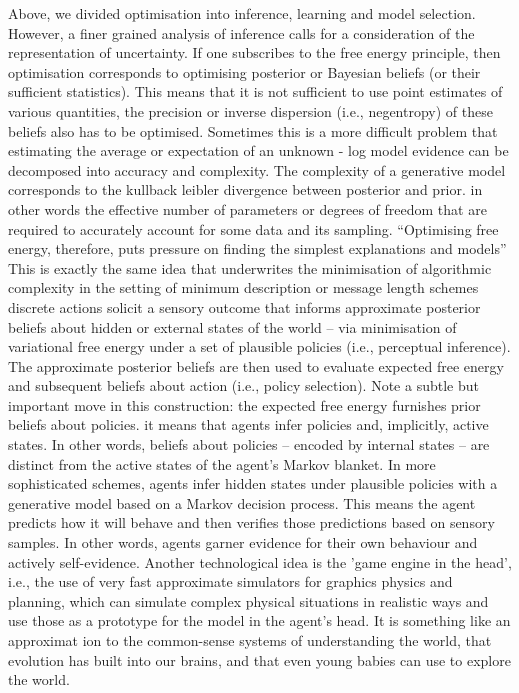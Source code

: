 Above, we divided optimisation into inference, learning and model selection. However, a finer grained analysis of inference calls for a consideration of the representation of uncertainty. If one subscribes to the free energy principle, then optimisation corresponds to optimising posterior or Bayesian beliefs (or their sufficient statistics). This means that it is not sufficient to use point estimates of various quantities, the precision or inverse dispersion (i.e., negentropy) of these beliefs also has to be optimised. Sometimes this is a more difficult problem that estimating the average or expectation of an unknown 
- log model evidence can be decomposed into accuracy and complexity. The complexity of a generative model corresponds to the kullback leibler divergence between posterior and prior. in other words the effective number of parameters or degrees of freedom that are required to accurately account for some data and its sampling. “Optimising free energy, therefore, puts pressure on finding the simplest explanations and models” 
This is exactly the same idea that underwrites the minimisation of algorithmic complexity in the setting of minimum description or message length schemes
discrete actions solicit a sensory outcome that informs approximate posterior beliefs about hidden or external states of the world – via minimisation of variational free energy under a set of plausible policies (i.e., perceptual inference). The approximate posterior beliefs are then used to evaluate expected free energy and subsequent beliefs about action (i.e., policy selection). Note a subtle but important move in this construction: the expected free energy furnishes prior beliefs about policies.
it means that agents infer policies and, implicitly, active states. In other words, beliefs about policies – encoded by internal states – are distinct from the active states of the agent’s Markov blanket. In more sophisticated schemes, agents infer hidden states under plausible policies with a generative model based on a Markov decision process. This means the agent predicts how it will behave and then verifies those predictions based on sensory samples. In other words, agents garner evidence for their own behaviour and actively self-evidence.
Another technological idea is the 'game engine in the head', i.e., the use of very fast approximate simulators for graphics physics and planning, which can simulate complex physical situations in realistic ways and use those as a prototype for the model in the agent’s head. It is something like an approximat ion to the common-sense systems of understanding the world, that evolution has built into our brains, and that even young babies can use to explore the world.


